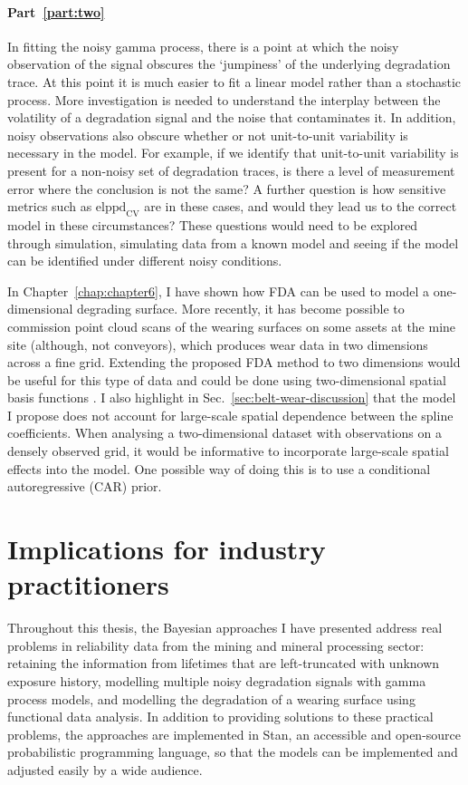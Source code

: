 \paragraph*{Part~\ref{part:two}} In fitting the noisy gamma process, there is a point at which the noisy observation of the signal obscures the `jumpiness' of the underlying degradation trace. At this point it is much easier to fit a linear model rather than a stochastic process. More investigation is needed to understand the interplay between the volatility of a degradation signal and the noise that contaminates it. In addition, noisy observations also obscure whether or not unit-to-unit variability is necessary in the model. For example, if we identify that unit-to-unit variability is present for a non-noisy set of degradation traces, is there a level of measurement error where the conclusion is not the same? A further question is how sensitive metrics such as $\mbox{elppd}_{\text{CV}}$ are in these cases, and would they lead us to the correct model in these circumstances? These questions would need to be explored through simulation, simulating data from a known model and seeing if the model can be identified under different noisy conditions.

In Chapter~\ref{chap:chapter6}, I have shown how FDA can be used to model a one-dimensional degrading surface. More recently, it has become possible to commission point cloud scans of the wearing surfaces on some assets at the mine site (although, not conveyors), which produces wear data in two dimensions across a fine grid. Extending the proposed FDA method to two dimensions would be useful for this type of data and could be done using two-dimensional spatial basis functions \citep[p. 84]{wikle_2019}. I also highlight in Sec.~\ref{sec:belt-wear-discussion} that the model I propose does not account for large-scale spatial dependence between the spline coefficients. When analysing a two-dimensional dataset with observations on a densely observed grid, it would be informative to incorporate large-scale spatial effects into the model. One possible way of doing this is to use a conditional autoregressive (CAR) prior.

\section{Implications for industry practitioners} \label{sec:thesis-practical}

Throughout this thesis, the Bayesian approaches I have presented address real problems in reliability data from the mining and mineral processing sector: retaining the information from lifetimes that are left-truncated with unknown exposure history, modelling multiple noisy degradation signals with gamma process models, and modelling the degradation of a wearing surface using functional data analysis. In addition to providing solutions to these practical problems, the approaches are implemented in Stan, an accessible and open-source probabilistic programming language, so that the models can be implemented and adjusted easily by a wide audience.

